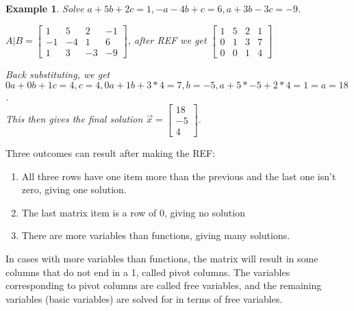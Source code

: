 \documentclass{article}
\newtheorem{example}{Example}
\begin{document}
\begin{example}
	Solve $a+5b+2c=1, -a-4b+c=6, a+3b-3c=-9$.

	$A|B=\left[\begin{array}{ccc|c}
			1&5&2&-1\\-1&-4&1&6\\1&3&-3&-9
			\end{array}\right]$,
	after REF we get $\left[\begin{array}{ccc|c}
		1&5&2&1\\0&1&3&7\\0&0&1&4
	\end{array}\right]$

	Back substituting, we get\\ 
	$0a+0b+1c=4,c=4, 0a+1b+3*4=7, b=-5, a+5*-5+2*4=1=a=18$.\\
	This then gives
	the final solution $\vec{x}=\begin{bmatrix}18\\-5\\4\end{bmatrix}$.
\end{example}

Three outcomes can result after making the REF:
\begin{enumerate}
	\item All three rows have one item more than the previous and the
		last one isn't zero, giving one solution.
	\item The last matrix item is a row of 0, giving no solution
	\item There are more variables than functions, giving many solutions.
\end{enumerate}

In cases with more variables than functions, the matrix will result in some columns that do not end in a 1, called pivot columns. The variables corresponding
to pivot columns are called free variables, and the remaining variables
(basic variables) are solved for in terms of free variables.
\end{document}
